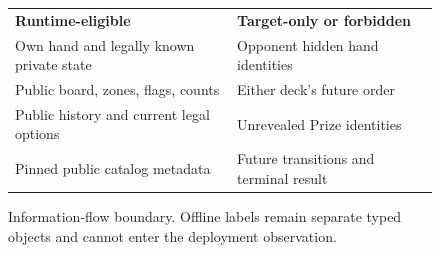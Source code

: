 \begin{figure}[t]
\centering
\footnotesize
\begin{tabularx}{\columnwidth}{>{\raggedright\arraybackslash}X >{\raggedright\arraybackslash}X}
\cellcolor{mint}\textbf{Runtime-eligible} &
\cellcolor{pale}\textbf{Target-only or forbidden} \\
\cellcolor{mint}Own hand and legally known private state &
\cellcolor{pale}Opponent hidden hand identities \\
\cellcolor{mint}Public board, zones, flags, counts &
\cellcolor{pale}Either deck's future order \\
\cellcolor{mint}Public history and current legal options &
\cellcolor{pale}Unrevealed Prize identities \\
\cellcolor{mint}Pinned public catalog metadata &
\cellcolor{pale}Future transitions and terminal result \\
\end{tabularx}
\caption{Information-flow boundary. Offline labels remain separate typed
objects and cannot enter the deployment observation.}
\label{fig:information-boundary}
\end{figure}
